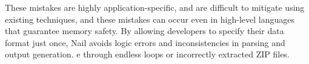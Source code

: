 These mistakes are highly application-specific, and
are difficult to mitigate using existing techniques, and these mistakes
can occur even in high-level languages that guarantee memory safety. By
allowing developers to specify their data format just once, Nail avoids
logic errors and inconsistencies in parsing and output generation.
e through endless loops
or incorrectly extracted ZIP files.







